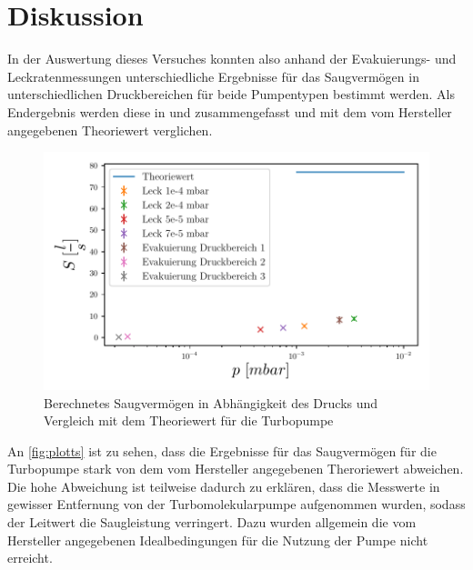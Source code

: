 \section{Diskussion}
\label{sec:Diskussion}

In der Auswertung dieses Versuches konnten also anhand der Evakuierungs- und Leckratenmessungen unterschiedliche Ergebnisse für das Saugvermögen in unterschiedlichen Druckbereichen für beide Pumpentypen bestimmt werden.  Als Endergebnis werden diese in und zusammengefasst und mit dem vom Hersteller angegebenen Theoriewert verglichen.

\begin{figure}[H]
    \centering
    \includegraphics{build/plots/saug_turbo.pdf}
    \caption{Berechnetes Saugvermögen in Abhängigkeit des Drucks und Vergleich mit dem Theoriewert für die Turbopumpe}
    \label{fig:plotts}
  \end{figure}
\noindent
An \autoref{fig:plotts} ist zu sehen, dass die Ergebnisse für das Saugvermögen für die Turbopumpe stark von dem vom Hersteller angegebenen Theroriewert abweichen. Die hohe Abweichung ist teilweise dadurch zu erklären, dass die Messwerte in gewisser Entfernung von der Turbomolekularpumpe aufgenommen wurden, sodass der Leitwert die Saugleistung verringert. Dazu wurden allgemein die vom Hersteller angegebenen Idealbedingungen für die Nutzung der Pumpe nicht erreicht.


